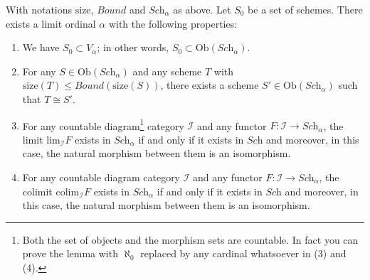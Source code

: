 \begin{lemma}
\label{lemma-construct-category}
With notations $\text{size}$, $Bound$ and $\textit{Sch}_\alpha$ as above.
Let $S_0$ be a set of schemes. There exists a limit ordinal
$\alpha$ with the following properties:
\begin{enumerate}
\item We have $S_0 \subset V_\alpha$; in other words,
$S_0 \subset \text{Ob}(\textit{Sch}_\alpha)$.
\label{item-inclusion}
\item For any $S \in \text{Ob}(\textit{Sch}_\alpha)$ and any
scheme $T$ with $\text{size}(T) \leq Bound(\text{size}(S))$,
there exists a scheme $S' \in \text{Ob}(\textit{Sch}_\alpha)$
such that $T \cong S'$.
\label{item-bounded}
\item For any countable diagram\footnote{Both the set of objects and
the morphism sets are countable. In fact you can prove the lemma with
$\aleph_0$ replaced by any cardinal whatsoever in (3) and (4).}
category $\mathcal{I}$ and
any functor $F : \mathcal{I} \to \textit{Sch}_\alpha$, the limit
$\text{lim}_\mathcal{I} F$ exists in $\textit{Sch}_\alpha$ if and
only if it exists in $\textit{Sch}$ and moreover, in this case,
the natural morphism between them is an isomorphism.
\label{item-limit}
\item For any countable diagram category $\mathcal{I}$ and
any functor $F : \mathcal{I} \to \textit{Sch}_\alpha$, the colimit
$\text{colim}_\mathcal{I} F$ exists in $\textit{Sch}_\alpha$ if and
only if it exists in $\textit{Sch}$ and moreover, in this case,
the natural morphism between them is an isomorphism.
\label{item-colimit}
\end{enumerate}
\end{lemma}

